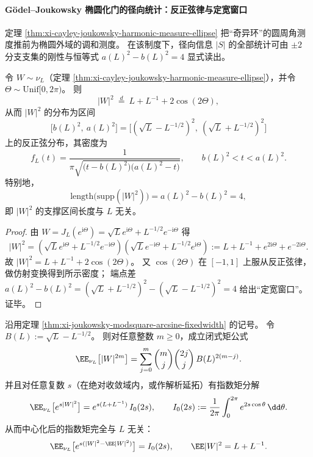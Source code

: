 \paragraph{Gödel--Joukowsky 椭圆化门的径向统计：反正弦律与定宽窗口}
定理 \ref{thm:xi-cayley-joukowsky-harmonic-measure-ellipse} 把“奇异环”的圆周角测度推前为椭圆外域的调和测度。
在该制度下，径向信息 \(|S|\) 的全部统计可由 \(\pm2\) 分支支集的刚性与恒等式 \(a(L)^2-b(L)^2=4\) 显式读出。

\begin{theorem}\label{thm:xi-joukowsky-modsquare-arcsine-fixedwidth}
令 \(W\sim \nu_L\)（定理 \ref{thm:xi-cayley-joukowsky-harmonic-measure-ellipse}），并令 \(\Theta\sim\mathrm{Unif}[0,2\pi)\)。
则
\[
|W|^2\ \stackrel{d}{=}\ L+L^{-1}+2\cos(2\Theta),
\]
从而 \(|W|^2\) 的分布为区间
\[
\bigl[b(L)^2,\ a(L)^2\bigr]
=\bigl[(\sqrt{L}-L^{-1/2})^2,\ (\sqrt{L}+L^{-1/2})^2\bigr]
\]
上的反正弦分布，其密度为
\[
f_L(t)=\frac{1}{\pi\sqrt{\bigl(t-b(L)^2\bigr)\bigl(a(L)^2-t\bigr)}},
\qquad
b(L)^2<t<a(L)^2.
\]
特别地，
\[
\mathrm{length}\bigl(\mathrm{supp}(|W|^2)\bigr)=a(L)^2-b(L)^2=4,
\]
即 \(|W|^2\) 的支撑区间长度与 \(L\) 无关。
\end{theorem}

\begin{proof}
由 \(W=J_L(e^{\mathrm{i}\Theta})=\sqrt{L}e^{\mathrm{i}\Theta}+L^{-1/2}e^{-\mathrm{i}\Theta}\) 得
\[
|W|^2=(\sqrt{L}e^{\mathrm{i}\Theta}+L^{-1/2}e^{-\mathrm{i}\Theta})(\sqrt{L}e^{-\mathrm{i}\Theta}+L^{-1/2}e^{\mathrm{i}\Theta})
:=L+L^{-1}+e^{2\mathrm{i}\Theta}+e^{-2\mathrm{i}\Theta}.
\]
故 \(|W|^2=L+L^{-1}+2\cos(2\Theta)\)。
又 \(\cos(2\Theta)\) 在 \([-1,1]\) 上服从反正弦律，做仿射变换得到所示密度；
端点差 \(a(L)^2-b(L)^2=(\sqrt{L}+L^{-1/2})^2-(\sqrt{L}-L^{-1/2})^2=4\) 给出“定宽窗口”。证毕。
\end{proof}

\begin{corollary}\label{cor:xi-joukowsky-modsquare-moments-bessel}
沿用定理 \ref{thm:xi-joukowsky-modsquare-arcsine-fixedwidth} 的记号。
令 \(B(L):=\sqrt{L}-L^{-1/2}\)。
则对任意整数 \(m\ge 0\)，成立闭式矩公式
\[
\EE_{\nu_L}\bigl[|W|^{2m}\bigr]
=\sum_{j=0}^m \binom{m}{j}\binom{2j}{j}\,B(L)^{2(m-j)}.
\]
并且对任意复数 \(s\)（在绝对收敛域内，或作解析延拓）有指数矩分解
\[
\EE_{\nu_L}\bigl[e^{s|W|^2}\bigr]
=e^{s(L+L^{-1})}\,I_0(2s),
\qquad
I_0(2s):=\frac{1}{2\pi}\int_{0}^{2\pi}e^{2s\cos\theta}\,\dd\theta.
\]
从而中心化后的指数矩完全与 \(L\) 无关：
\[
\EE_{\nu_L}\bigl[e^{s(|W|^2-\EE|W|^2)}\bigr]=I_0(2s),
\qquad
\EE|W|^2=L+L^{-1}.
\]
\end{corollary}

